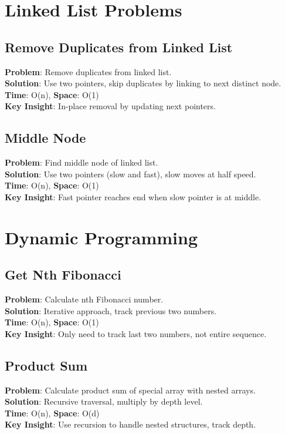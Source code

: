 \documentclass{report}
\begin{document}
\section{Linked List Problems}

\subsection{Remove Duplicates from Linked List}
\textbf{Problem}: Remove duplicates from linked list.\\
\textbf{Solution}: Use two pointers, skip duplicates by linking to next distinct node.\\
\textbf{Time}: O(n), \textbf{Space}: O(1)\\
\textbf{Key Insight}: In-place removal by updating next pointers.

\subsection{Middle Node}
\textbf{Problem}: Find middle node of linked list.\\
\textbf{Solution}: Use two pointers (slow and fast), slow moves at half speed.\\
\textbf{Time}: O(n), \textbf{Space}: O(1)\\
\textbf{Key Insight}: Fast pointer reaches end when slow pointer is at middle.

\section{Dynamic Programming}

\subsection{Get Nth Fibonacci}
\textbf{Problem}: Calculate nth Fibonacci number.\\
\textbf{Solution}: Iterative approach, track previous two numbers.\\
\textbf{Time}: O(n), \textbf{Space}: O(1)\\
\textbf{Key Insight}: Only need to track last two numbers, not entire sequence.

\subsection{Product Sum}
\textbf{Problem}: Calculate product sum of special array with nested arrays.\\
\textbf{Solution}: Recursive traversal, multiply by depth level.\\
\textbf{Time}: O(n), \textbf{Space}: O(d)\\
\textbf{Key Insight}: Use recursion to handle nested structures, track depth.
\end{document}
